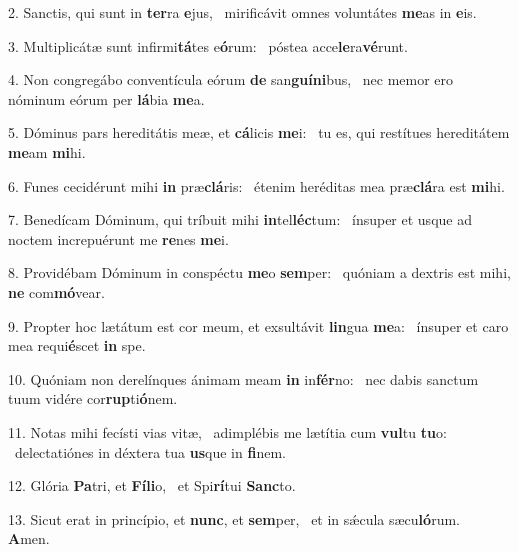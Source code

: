 2. Sanctis, qui sunt in \textbf{ter}ra \textbf{e}jus, \ast\  mirificávit omnes voluntátes \textbf{me}as in \textbf{e}is.\

3. Multiplicátæ sunt infirmi\textbf{tá}tes e\textbf{ó}rum: \ast\  póstea acce\textbf{le}ra\textbf{vé}runt.\

4. Non congregábo conventícula eórum \textbf{de} san\textbf{guí}\textbf{ni}bus, \ast\  nec memor ero nóminum eórum per \textbf{lá}bia \textbf{me}a.\

5. Dóminus pars hereditátis meæ, et \textbf{cá}licis \textbf{me}i: \ast\  tu es, qui restítues hereditátem \textbf{me}am \textbf{mi}hi.\

6. Funes cecidérunt mihi \textbf{in} præ\textbf{clá}ris: \ast\  étenim heréditas mea præ\textbf{clá}ra est \textbf{mi}hi.\

7. Benedícam Dóminum, qui tríbuit mihi \textbf{in}tel\textbf{léc}tum: \ast\  ínsuper et usque ad noctem increpuérunt me \textbf{re}nes \textbf{me}i.\

8. Providébam Dóminum in conspéctu \textbf{me}o \textbf{sem}per: \ast\  quóniam a dextris est mihi, \textbf{ne} com\textbf{mó}vear.\

9. Propter hoc lætátum est cor meum, et exsultávit \textbf{lin}gua \textbf{me}a: \ast\  ínsuper et caro mea requi\textbf{é}scet \textbf{in} spe.\

10. Quóniam non derelínques ánimam meam \textbf{in} in\textbf{fér}no: \ast\  nec dabis sanctum tuum vidére cor\textbf{rup}ti\textbf{ó}nem.\

11. Notas mihi fecísti vias vitæ, \dag\  adimplébis me lætítia cum \textbf{vul}tu \textbf{tu}o: \ast\  delectatiónes in déxtera tua \textbf{us}que in \textbf{fi}nem.\

12. Glória \textbf{Pa}tri, et \textbf{Fí}\textbf{li}o, \ast\  et Spi\textbf{rí}tui \textbf{Sanc}to.\

13. Sicut erat in princípio, et \textbf{nunc}, et \textbf{sem}per, \ast\  et in sǽcula sæcu\textbf{ló}rum. \textbf{A}men.\

